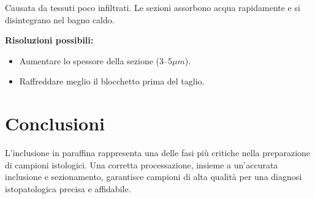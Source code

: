 Causata da tessuti poco infiltrati. Le sezioni assorbono acqua rapidamente e si disintegrano nel bagno caldo.

\textbf{Risoluzioni possibili:}
\begin{itemize}
    \item Aumentare lo spessore della sezione ($3–5\mu m$).
    \item Raffreddare meglio il blocchetto prima del taglio.
\end{itemize}


\section{Conclusioni}

L'inclusione in paraffina rappresenta una delle fasi più critiche nella preparazione di campioni istologici. Una corretta processazione, insieme a un'accurata inclusione e sezionamento, garantisce campioni di alta qualità per una diagnosi istopatologica precisa e affidabile.

